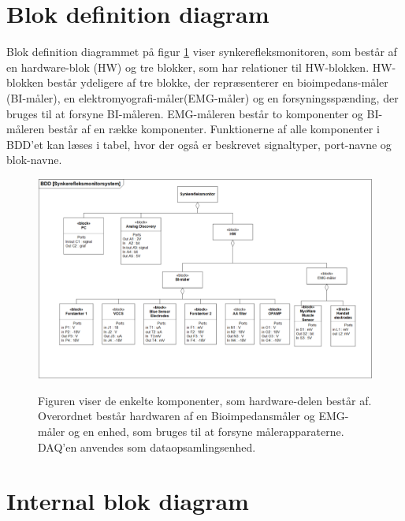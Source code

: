 \section{Blok definition diagram}

Blok definition diagrammet på figur \ref{figbdd} viser synkerefleksmonitoren, som består af en hardware-blok (HW) og tre blokker, som har relationer til HW-blokken. HW-blokken består ydeligere af tre blokke, der repræsenterer en bioimpedans-måler (BI-måler), en elektromyografi-måler(EMG-måler) og en forsyningsspænding, der bruges til at forsyne BI-måleren.  EMG-måleren består to komponenter og BI-måleren består af en række komponenter. Funktionerne af alle komponenter i BDD'et kan læses i tabel, hvor der også er beskrevet signaltyper, port-navne og blok-navne.  

\begin{figure}[H] 
\centering
{\includegraphics[width=\linewidth]
{Figure/IBDNY}}
\caption{Figuren viser de enkelte komponenter, som hardware-delen består af. Overordnet består hardwaren af en Bioimpedansmåler og EMG-måler og en enhed, som bruges til at forsyne  målerapparaterne. DAQ'en anvendes som dataopsamlingsenhed.}
\label{figbdd}
\end{figure}

\section{Internal blok diagram}

